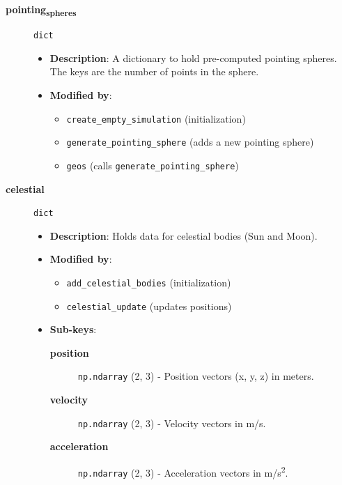 \documentclass[11pt]{article}
\begin{document}
\begin{description}
\item[{\textbf{pointing\textsubscript{spheres}}}] \texttt{dict}
\begin{itemize}
\item \textbf{Description}: A dictionary to hold pre-computed pointing spheres. The keys are the number of points in the sphere.
\item \textbf{Modified by}:
\begin{itemize}
\item \texttt{create\_empty\_simulation} (initialization)
\item \texttt{generate\_pointing\_sphere} (adds a new pointing sphere)
\item \texttt{geos} (calls \texttt{generate\_pointing\_sphere})
\end{itemize}
\end{itemize}

\item[{\textbf{celestial}}] \texttt{dict}
\begin{itemize}
\item \textbf{Description}: Holds data for celestial bodies (Sun and Moon).
\item \textbf{Modified by}:
\begin{itemize}
\item \texttt{add\_celestial\_bodies} (initialization)
\item \texttt{celestial\_update} (updates positions)
\end{itemize}
\item \textbf{Sub-keys}:
\begin{description}
\item[{\textbf{position}}] \texttt{np.ndarray} (2, 3) - Position vectors (x, y, z) in meters.
\item[{\textbf{velocity}}] \texttt{np.ndarray} (2, 3) - Velocity vectors in m/s.
\item[{\textbf{acceleration}}] \texttt{np.ndarray} (2, 3) - Acceleration vectors in m/s\textsuperscript{2}.
\end{description}
\end{itemize}


\end{description}
\end{document}
